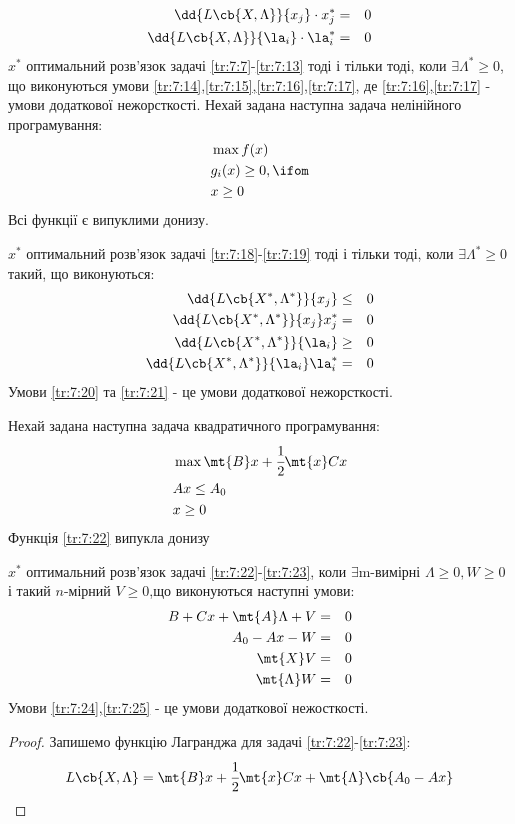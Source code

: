 \begin{eqnarray}
\dd{L\cb{X,\Lambda}}{x_j} \cdot x_j^\ast &=& 0\label{tr:7:16}\\
\dd{L\cb{X,\Lambda}}{\la_i} \cdot \la_i^\ast &=&0\label{tr:7:17}
\end{eqnarray}
$x^\ast$ оптимальний розв’язок задачі \eqref{tr:7:7}-\eqref{tr:7:13} тоді і тільки тоді, коли $\exists\Lambda^\ast\geq 0$, що виконуються умови \eqref{tr:7:14},\eqref{tr:7:15},\eqref{tr:7:16},\eqref{tr:7:17}, де \eqref{tr:7:16},\eqref{tr:7:17} - умови додаткової нежорсткості.
Нехай задана наступна задача нелінійного програмування:
\begin{eqnarray}
&\max f(x)\label{tr:7:18}\\
&g_i(x) \geq 0,\ifom\\
&x \geq 0 \label{tr:7:19}
\end{eqnarray}
Всі функції є випуклими донизу.
\begin{teor}
$x^\ast$ оптимальний розв’язок задачі \eqref{tr:7:18}-\eqref{tr:7:19} тоді і тільки тоді, коли $\exists \Lambda^\ast\geq0$ такий, що виконуються:
\begin{eqnarray}
\dd {L\cb{X^\ast,\Lambda^\ast}}{x_j} &\leq& 0\\
\dd {L\cb{X^\ast,\Lambda^\ast}}{x_j} x_j^\ast &=& 0\label{tr:7:20}\\
\dd {L\cb{X^\ast,\Lambda^\ast}}{\la_i} &\geq& 0 \\
\dd {L\cb{X^\ast,\Lambda^\ast}}{\la_i} \la_i^\ast &=& 0\label{tr:7:21}
\end{eqnarray}
Умови \eqref{tr:7:20} та \eqref{tr:7:21} - це умови додаткової нежорсткості.
\end{teor}
Нехай задана наступна задача квадратичного програмування:
\begin{eqnarray}
&\max \mt{B} x + \cfrac12  \mt{x} C x\label{tr:7:22}\\
&Ax\leq A_0\\
&x\geq 0\label{tr:7:23}
\end{eqnarray}
Функція \eqref{tr:7:22} випукла донизу
\begin{teor}
$x^\ast$ оптимальний розв’язок задачі \eqref{tr:7:22}-\eqref{tr:7:23}, коли $\exists$m-вимірні $\Lambda\geq0,W\geq0$ і такий $n$-мірний $V\geq 0$,що виконуються наступні умови:
\begin{eqnarray}
B+Cx +\mt{A}\Lambda + V&=&0\\
A_0-Ax -W &=&0\\
\mt{X}V&=&0\label{tr:7:24}\\
\mt{\Lambda}W&=&0\label{tr:7:25}
\end{eqnarray}
Умови \eqref{tr:7:24},\eqref{tr:7:25} - це умови додаткової нежосткості.
\end{teor}
\begin{proof}
Запишемо функцію Лагранджа для задачі \eqref{tr:7:22}-\eqref{tr:7:23}:
\begin{equation}
L\cb{X,\Lambda} = \mt{B}x+\cfrac12 \mt{x}Cx + \mt{\Lambda}\cb{A_0-Ax}
\end{equation}
\end{proof}